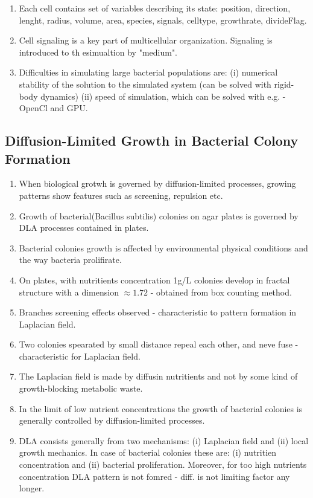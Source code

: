 \documentclass[10pt,a4paper]{article}
\begin{document}
\begin{enumerate}
 \item Each cell contains set of variables describing its state: position, direction, lenght, radius, volume, area, species, signals, celltype, growthrate, divideFlag. 
 \item Cell signaling is a key part of multicellular organization.  Signaling is introduced to th esimualtion by "medium".
 \item Difficulties in simulating large bacterial populations are: (i) numerical stability of the solution to the simulated system (can be solved with rigid-body dynamics)
 (ii) speed of simulation, which can be solved with e.g. - OpenCl and GPU.
\end{enumerate}

\subsection{Diffusion-Limited Growth in Bacterial Colony Formation \cite{MH:90}}
\begin{enumerate}
 \item When biological grotwh is governed by diffusion-limited processes, growing patterns show features such as screening, repulsion etc.
 \item Growth of bacterial(Bacillus subtilis) colonies on agar plates is governed by DLA processes contained in plates.
 \item Bacterial colonies growth is affected by environmental physical conditions and the way bacteria prolifirate. 
 \item On plates, with nutritients concentration 1g/L colonies develop in fractal structure with a dimension $\approx 1.72$ - obtained from box counting method.
 \item Branches screening effects observed - characteristic to pattern formation in Laplacian field.
 \item Two colonies spearated by small distance repeal each other, and neve fuse - characteristic for Laplacian field. 
 \item The Laplacian field is made by diffusin nutritients and not by some kind of growth-blocking metabolic waste. 
 \item In the limit of low nutrient concentrations the growth of bacterial colonies is generally controlled by diffusion-limited processes.
 \item DLA consists generally from two mechanisms: (i) Laplacian field and (ii) local growth mechanics. In case of bacterial colonies these are:
 (i) nutritien concentration and (ii) bacterial proliferation. Moreover, for too high nutrients concentration DLA pattern is not fomred -  diff. is not limiting factor any longer. 
\end{enumerate}
\end{document}
